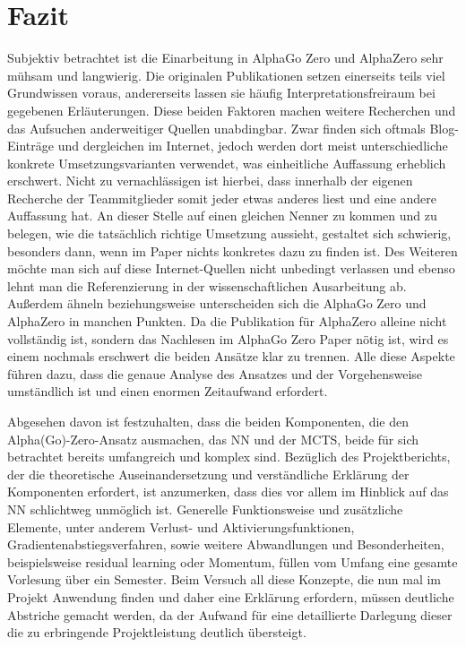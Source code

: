 \documentclass[12pt,a4paper]{article}
\begin{document}
\newpage
\section{Fazit}

Subjektiv betrachtet ist die Einarbeitung in AlphaGo Zero und AlphaZero sehr mühsam und langwierig. Die originalen Publikationen setzen einerseits teils viel Grundwissen voraus, andererseits lassen sie häufig Interpretationsfreiraum bei gegebenen Erläuterungen. Diese beiden Faktoren machen weitere Recherchen und das Aufsuchen anderweitiger Quellen unabdingbar. Zwar finden sich oftmals Blog-Einträge und dergleichen im Internet, jedoch werden dort meist unterschiedliche konkrete Umsetzungsvarianten verwendet, was einheitliche Auffassung erheblich erschwert. Nicht zu vernachlässigen ist hierbei, dass innerhalb der eigenen Recherche der Teammitglieder somit jeder etwas anderes liest und eine andere Auffassung hat. An dieser Stelle auf einen gleichen Nenner zu kommen und zu belegen, wie die tatsächlich richtige Umsetzung aussieht, gestaltet sich schwierig, besonders dann, wenn im Paper nichts konkretes dazu zu finden ist. Des Weiteren möchte man sich auf diese Internet-Quellen nicht unbedingt verlassen und ebenso lehnt man die Referenzierung in der wissenschaftlichen Ausarbeitung ab. Außerdem ähneln beziehungsweise unterscheiden sich die AlphaGo Zero und AlphaZero in manchen Punkten. Da die Publikation für AlphaZero alleine nicht vollständig ist, sondern das Nachlesen im AlphaGo Zero Paper nötig ist, wird es einem nochmals erschwert die beiden Ansätze klar zu trennen. Alle diese Aspekte führen dazu, dass die genaue Analyse des Ansatzes und der Vorgehensweise umständlich ist und einen enormen Zeitaufwand erfordert. 

Abgesehen davon ist festzuhalten, dass die beiden Komponenten, die den Alpha(Go)-Zero-Ansatz ausmachen, das NN und der MCTS, beide für sich betrachtet bereits umfangreich und komplex sind. Bezüglich des Projektberichts, der die theoretische Auseinandersetzung und verständliche Erklärung der Komponenten erfordert, ist anzumerken, dass dies vor allem im Hinblick auf das NN schlichtweg unmöglich ist. Generelle Funktionsweise und zusätzliche Elemente, unter anderem Verlust- und Aktivierungsfunktionen, Gradientenabstiegsverfahren, sowie weitere Abwandlungen und Besonderheiten, beispielsweise residual learning oder Momentum, füllen vom Umfang eine gesamte Vorlesung über ein Semester. Beim Versuch all diese Konzepte, die nun mal im Projekt Anwendung finden und daher eine Erklärung erfordern, müssen deutliche Abstriche gemacht werden, da der Aufwand für eine detaillierte Darlegung dieser die zu erbringende Projektleistung deutlich übersteigt.
\end{document}
